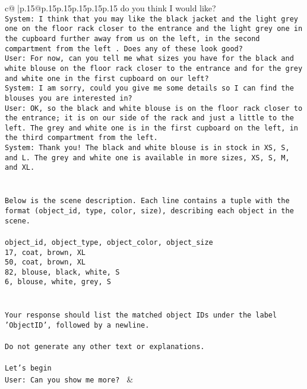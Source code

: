 \documentclass{article}
\begin{document}
{\begin{supertabular}{c@{$\;$}|p{.15\linewidth}@{}p{.15\linewidth}p{.15\linewidth}p{.15\linewidth}p{.15\linewidth}p{.15\linewidth}}
{{{do you think I would like?\\ \tt System: I think that you may like the black jacket and the light grey one on the floor rack closer to the entrance and the light grey one in the cupboard further away from us on the left, in the second compartment from the left . Does any of these look good?\\ \tt User: For now, can you tell me what sizes you have for the black and white blouse on the floor rack closer to the entrance and for the grey and white one in the first cupboard on our left?\\ \tt System: I am sorry, could you give me some details so I can find the blouses you are interested in?\\ \tt User: OK, so the black and white blouse is on the floor rack closer to the entrance; it is on our side of the rack and just a little to the left. The grey and white one is in the first cupboard on the left, in the  third compartment from the left.\\ \tt System: Thank you! The black and white blouse is in stock in XS, S, and L. The grey and white one is available in more sizes, XS, S, M, and XL.\\ \tt \\ \tt \\ \tt Below is the scene description. Each line contains a tuple with the format (object_id, type, color, size), describing each object in the scene.\\ \tt \\ \tt object_id, object_type, object_color, object_size\\ \tt 17, coat, brown, XL\\ \tt 50, coat, brown, XL\\ \tt 82, blouse, black, white, S\\ \tt 6, blouse, white, grey, S\\ \tt \\ \tt \\ \tt Your response should list the matched object IDs under the label 'ObjectID', followed by a newline.\\ \tt \\ \tt Do not generate any other text or explanations.\\ \tt \\ \tt Let's begin\\ \tt User: Can you show  me more? 
	  } 
	   } 
	   } 
	 & \\ 
 

    \theutterance {}  


\end{supertabular}}
\end{document}
